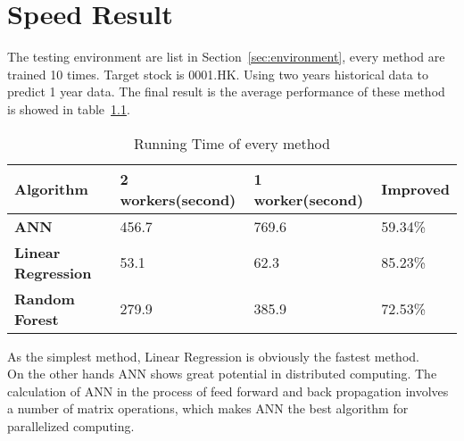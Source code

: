 \chapter{Speed Result}
\label{ch:speedResult}

The testing environment are list in Section~\ref{sec:environment}, every method are trained 10 times. Target stock is 0001.HK. Using two years historical data to predict 1 year data. The final result is the average performance of these method is showed in table~\ref{tb:running_time}.

\begin{table}[h]
	\centering
	\begin{tabular}{|l|l|l|l|}
		\hline
		\textbf{Algorithm}         & \textbf{2 workers(second)} & \textbf{1 worker(second)} & \textbf{Improved} \\ \hline
		\textbf{ANN}               & 456.7                      & 769.6                     & 59.34\%           \\ \hline
		\textbf{Linear Regression} & 53.1                       & 62.3                      & 85.23\%           \\ \hline
		\textbf{Random Forest}     & 279.9                      & 385.9                     & 72.53\%           \\ \hline
	\end{tabular}
	\caption{Running Time of every method}
	\label{tb:running_time}
\end{table}

As the simplest method, Linear Regression is obviously the fastest method.\\


On the other hands ANN shows great potential in distributed computing. The calculation of ANN in the process of feed forward and back propagation involves a number of matrix operations, which makes ANN the best algorithm for parallelized computing.